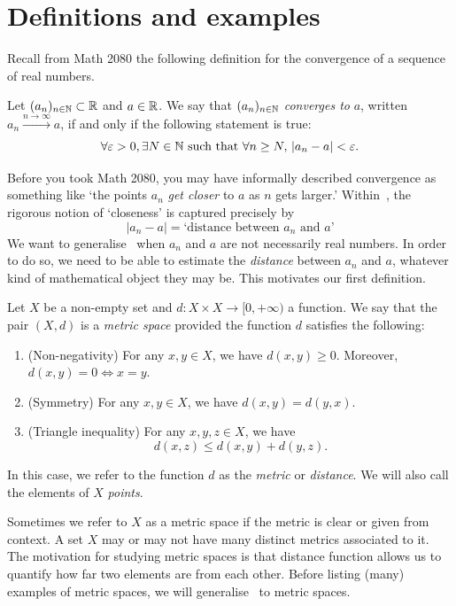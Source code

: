 \section{Definitions and examples}
\label{sec:def_met}
Recall from Math 2080 the following definition for the convergence of a sequence of real numbers.
\begin{defn}
	\label{defn:cvg_real}
	Let $(a_n)_{n\in\mathbb{N}}\subset \mathbb{R}$ and $a\in \mathbb{R}$. We say that $(a_n)_{n\in\mathbb{N}}$ \textit{converges to }$a$, written $a_n\overset{n\to \infty}{\to}a$, if and only if the following statement is true:
	\[
	\forall \varepsilon>0,\exists N\in\mathbb{N}\text{ such that }\forall n\ge N, \, |a_n - a|<\varepsilon.
	\]
\end{defn}
Before you took Math 2080, you may have informally described convergence as something like `the points $a_n$ \textit{get closer} to $a$ as $n$ gets larger.' Within~, the rigorous notion of `closeness' is captured precisely by
\[
|a_n-a| = \text{`distance between }a_n\text{ and }a\text{'}
\]
We want to generalise~ when $a_n$ and $a$ are not necessarily real numbers. In order to do so, we need to be able to estimate the \textit{distance} between $a_n$ and $a$, whatever kind of mathematical object they may be. This motivates our first definition.
\begin{defn}
	\label{defn:metric}
	Let $X$ be a non-empty set and $d:X\times X \to [0,+\infty)$ a function. We say that the pair $(X,d)$ is a \textit{metric space} provided the function $d$ satisfies the following:
	\begin{enumerate}[label = \textbf{M\arabic*)}]
		\item (Non-negativity) For any $x,y\in X$, we have $d(x,y)\ge 0$. Moreover, $d(x,y) = 0 \iff x=y$. \label{m:pos}
		\item (Symmetry) For any $x,y\in X$, we have $d(x,y) = d(y,x)$. \label{m:sym}
		\item (Triangle inequality) For any $x,y,z\in X$, we have
		\[
		d(x,z) \le d(x,y) + d(y,z).
		\]
		\label{m:tri}
	\end{enumerate}
	In this case, we refer to the function $d$ as the \textit{metric} or \textit{distance}. We will also call the elements of $X$ \textit{points}.
\end{defn}
Sometimes we refer to $X$ as a metric space if the metric is clear or given from context. A set $X$ may or may not have many distinct metrics associated to it. The motivation for studying metric spaces is that distance function allows us to quantify how far two elements are from each other. Before listing (many) examples of metric spaces, we will generalise~ to metric spaces.
